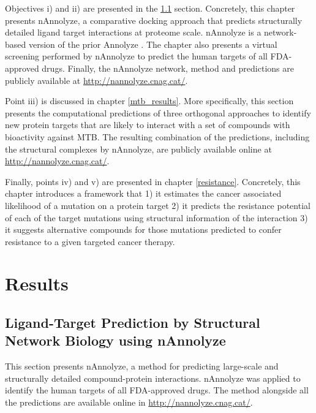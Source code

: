 \documentclass[11pt, b5paper,twoside]{tesi_upf}
\begin{document}
\par Objectives i) and ii) are presented in the \ref{nannolyze} section. Concretely, this chapter presents nAnnolyze, a comparative docking approach that predicts structurally detailed ligand target interactions at proteome scale. nAnnolyze is a network-based version of the prior Annolyze \cite{Marti-Renom2007}. The chapter also presents a virtual screening performed by nAnnolyze to predict the human targets of all FDA-approved drugs. Finally, the nAnnolyze network, method and predictions are publicly available at  \url{http://nannolyze.cnag.cat/}.

\par Point iii) is discussed in chapter \ref{mtb_results}. More specifically, this section presents the computational predictions    of three orthogonal approaches to identify new protein targets that are likely to interact with a set of compounds with bioactivity against MTB. The resulting combination of the predictions, including the structural complexes by nAnnolyze, are publicly available online at \url{http://nannolyze.cnag.cat/}.      

\par Finally, points iv) and v) are presented in chapter \ref{resistance}. Concretely, this chapter introduces a framework that 1) it estimates the cancer associated likelihood of a mutation on a protein target 2) it predicts the resistance potential of each of the target mutations using structural information of the interaction 3) it suggests alternative compounds for those mutations predicted to confer resistance to a given targeted cancer therapy.




\section{Results}

\subsection{Ligand-Target Prediction by Structural Network Biology using nAnnolyze}\label{nannolyze}

\par This section presents nAnnolyze, a method for predicting large-scale and structurally detailed compound-protein interactions. nAnnolyze was applied to identify the human targets of all FDA-approved drugs. The method alongside all the predictions are available online in \url{http://nannolyze.cnag.cat/}.
\end{document}
